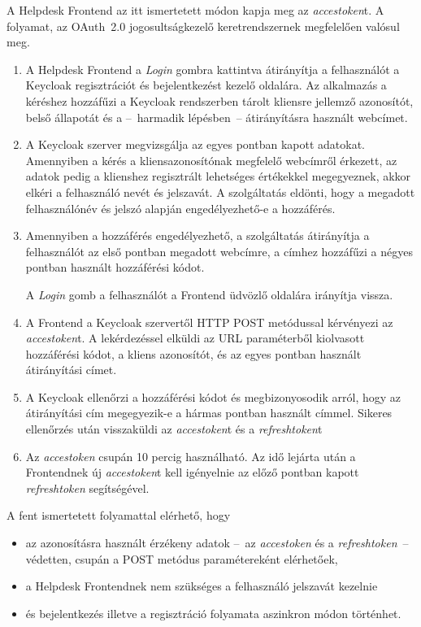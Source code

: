 A Helpdesk Frontend az itt ismertetett módon kapja meg az \emph{acces\textunderscore token}t. A folyamat, az OAuth~2.0 jogosultságkezelő keretrendszernek megfelelően valósul meg.


\begin{enumerate}
	\item A Helpdesk Frontend a \emph{Login} gombra kattintva átirányítja a felhasználót a Key\-cloak regisztrációt és bejelentkezést kezelő oldalára. Az alkalmazás a kéréshez hozzáfűzi a Keycloak rendszerben tárolt kliensre jellemző azonosítót, belső állapotát és a --~harmadik lépésben~-- átirányításra használt webcímet.
	
	
	\item A Keycloak szerver megvizsgálja az egyes pontban kapott adatokat. Amennyiben a kérés a kliensazonosítónak megfelelő webcímről érkezett, az adatok pedig a klienshez regisztrált lehetséges értékekkel megegyeznek, akkor elkéri a felhasználó nevét és jelszavát. A szolgáltatás eldönti, hogy a megadott felhasználónév és jelszó alapján engedélyezhető-e a hozzáférés.
		
	
	\item Amennyiben a hozzáférés engedélyezhető, a szolgáltatás átirányítja a felhasználót az első pontban megadott webcímre, a címhez hozzáfűzi a négyes pontban használt hozzáférési kódot.
	
	 A \emph{Login} gomb a felhasználót a Frontend üdvözlő oldalára irányítja vissza.
	
	
	\item A Frontend a Keycloak szervertől HTTP POST metódussal kérvényezi az \emph{acces\textunderscore token}t. A lekérdezéssel elküldi az URL paraméterből kiolvasott hozzáférési kódot, a kliens azonosítót, és az egyes pontban használt átirányítási címet.
	
	
	\item A Keycloak ellenőrzi a hozzáférési kódot és megbizonyosodik arról, hogy az átirányítási cím megegyezik-e a hármas pontban használt címmel. Sikeres ellenőrzés után visszaküldi az \emph{acces\textunderscore token}t és a \emph{refresh\textunderscore token}t
	
	
	\item Az \emph{acces\textunderscore token} csupán 10 percig használható. Az idő lejárta után a Frontendnek új \emph{acces\textunderscore token}t kell igényelnie az előző pontban kapott \emph{refresh\textunderscore token} segítségével.
\end{enumerate}

A fent ismertetett folyamattal elérhető, hogy
\begin{itemize}
	\item az azonosításra használt érzékeny adatok --~az \emph{acces\textunderscore token} és a \emph{refresh\textunderscore token}~-- védetten, csupán a POST metódus paramétereként elérhetőek,
	
	\item a Helpdesk Frontendnek nem szükséges a felhasználó jelszavát kezelnie
	
	\item  és bejelentkezés illetve a regisztráció folyamata aszinkron módon történhet.
\end{itemize}


